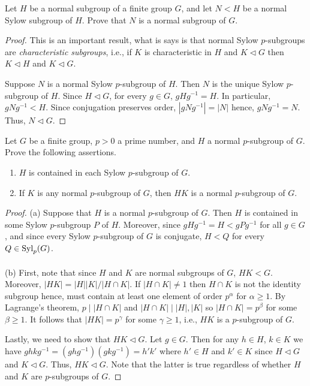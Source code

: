 \begin{problem}
Let $H$ be a normal subgroup of a finite group $G$, and let
$N<H$ be a normal Sylow subgroup of $H$. Prove that $N$ is a normal
subgroup of $G$.
\end{problem}
\begin{proof}
This is an important result, what is says is that normal Sylow
$p$-subgroups are \emph{characteristic subgroups}, i.e., if $K$ is
characteristic in $H$ and $K\lhd G$ then $K\lhd H$ and $K\lhd G$.

Suppose $N$ is a normal Sylow $p$-subgroup of $H$. Then $N$ is the unique
Sylow $p$-subgroup of $H$. Since $H\lhd G$, for every $g\in G$,
$gHg^{-1}=H$. In particular, $gNg^{-1}<H$. Since conjugation preserves
order, $|gNg^{-1}|=|N|$ hence, $gNg^{-1}=N$. Thus, $N\lhd G$.
\end{proof}

\begin{problem}
Let $G$ be a finite group, $p>0$ a prime number, and $H$ a
normal $p$-subgroup of $G$. Prove the following assertions.
\begin{enumerate}[label=(\alph*)]
\item $H$ is contained in each Sylow $p$-subgroup of $G$.
\item If $K$ is any normal $p$-subgroup of $G$, then $HK$ is a
normal $p$-subgroup of $G$.
\end{enumerate}
\end{problem}
\begin{proof}
(a) Suppose that $H$ is a normal $p$-subgroup of $G$. Then $H$ is contained
in some Sylow $p$-subgroup $P$ of $H$. Moreover, since
$gHg^{-1}=H<gPg^{-1}$ for all $g\in G$, and since every Sylow $p$-subgroup
of $G$ is conjugate, $H<Q$ for every $Q\in\operatorname{Syl}_p(G)$.
\\\\
(b) First, note that since $H$ and $K$ are normal subgroups of $G$,
$HK<G$. Moreover, $|HK|=|H||K|/|H\cap K|$. If $|H\cap K|\neq 1$ then $H\cap
K$ is not the identity subgroup hence, must contain at least one element of
order $p^\alpha$ for $\alpha\geq 1$. By Lagrange's theorem, $p\mid |H\cap
K|$ and $|H\cap K|\mid |H|,|K|$ so $|H\cap K|=p^\beta$ for some $\beta\geq
1$. It follows that $|HK|=p^\gamma$ for some $\gamma\geq 1$, i.e., $HK$ is
a $p$-subgroup of $G$.

Lastly, we need to show that $HK\lhd G$. Let $g\in G$. Then for any $h\in
H$, $k\in K$ we have $ghkg^{-1}=(ghg^{-1})(gkg^{-1})=h'k'$ where $h'\in H$
and $k'\in K$ since $H\lhd G$ and $K\lhd G$. Thus, $HK\lhd G$. Note that
the latter is true regardless of whether $H$ and $K$ are $p$-subgroups of
$G$.
\end{proof}

